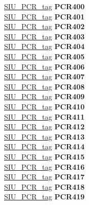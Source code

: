 \begin{DoxyCompactItemize}
\begin{tabbing}
\>\>\mbox{\hyperlink{unionSIU__tag_1_1SIU__PCR__tag}{SIU\_PCR\_tag}} {\bfseries PCR400}\\
\>\>\mbox{\hyperlink{unionSIU__tag_1_1SIU__PCR__tag}{SIU\_PCR\_tag}} {\bfseries PCR401}\\
\>\>\mbox{\hyperlink{unionSIU__tag_1_1SIU__PCR__tag}{SIU\_PCR\_tag}} {\bfseries PCR402}\\
\>\>\mbox{\hyperlink{unionSIU__tag_1_1SIU__PCR__tag}{SIU\_PCR\_tag}} {\bfseries PCR403}\\
\>\>\mbox{\hyperlink{unionSIU__tag_1_1SIU__PCR__tag}{SIU\_PCR\_tag}} {\bfseries PCR404}\\
\>\>\mbox{\hyperlink{unionSIU__tag_1_1SIU__PCR__tag}{SIU\_PCR\_tag}} {\bfseries PCR405}\\
\>\>\mbox{\hyperlink{unionSIU__tag_1_1SIU__PCR__tag}{SIU\_PCR\_tag}} {\bfseries PCR406}\\
\>\>\mbox{\hyperlink{unionSIU__tag_1_1SIU__PCR__tag}{SIU\_PCR\_tag}} {\bfseries PCR407}\\
\>\>\mbox{\hyperlink{unionSIU__tag_1_1SIU__PCR__tag}{SIU\_PCR\_tag}} {\bfseries PCR408}\\
\>\>\mbox{\hyperlink{unionSIU__tag_1_1SIU__PCR__tag}{SIU\_PCR\_tag}} {\bfseries PCR409}\\
\>\>\mbox{\hyperlink{unionSIU__tag_1_1SIU__PCR__tag}{SIU\_PCR\_tag}} {\bfseries PCR410}\\
\>\>\mbox{\hyperlink{unionSIU__tag_1_1SIU__PCR__tag}{SIU\_PCR\_tag}} {\bfseries PCR411}\\
\>\>\mbox{\hyperlink{unionSIU__tag_1_1SIU__PCR__tag}{SIU\_PCR\_tag}} {\bfseries PCR412}\\
\>\>\mbox{\hyperlink{unionSIU__tag_1_1SIU__PCR__tag}{SIU\_PCR\_tag}} {\bfseries PCR413}\\
\>\>\mbox{\hyperlink{unionSIU__tag_1_1SIU__PCR__tag}{SIU\_PCR\_tag}} {\bfseries PCR414}\\
\>\>\mbox{\hyperlink{unionSIU__tag_1_1SIU__PCR__tag}{SIU\_PCR\_tag}} {\bfseries PCR415}\\
\>\>\mbox{\hyperlink{unionSIU__tag_1_1SIU__PCR__tag}{SIU\_PCR\_tag}} {\bfseries PCR416}\\
\>\>\mbox{\hyperlink{unionSIU__tag_1_1SIU__PCR__tag}{SIU\_PCR\_tag}} {\bfseries PCR417}\\
\>\>\mbox{\hyperlink{unionSIU__tag_1_1SIU__PCR__tag}{SIU\_PCR\_tag}} {\bfseries PCR418}\\
\>\>\mbox{\hyperlink{unionSIU__tag_1_1SIU__PCR__tag}{SIU\_PCR\_tag}} {\bfseries PCR419}\\

\end{tabbing}
\end{DoxyCompactItemize}
